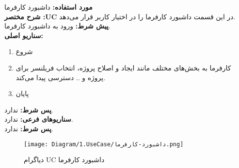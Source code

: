 \textbf{مورد استفاده:}
داشبورد کارفرما
\\
\textbf{شرح مختصر :UC}
در این قسمت داشبورد کارفرما را در اختیار کاربر قرار می‌دهد.
\\
\textbf{پيش شرط:}
ورود به داشبورد کارفرما.
\\
\textbf{سناريو اصلی:}
\begin{enumerate}
	\item
	شروع
	\item
	کارفرما به بخش‌های مختلف مانند ایجاد و اصلاح پروژه، انتخاب فریلنسر برای پروژه و .. دسترسی پیدا می‌کند.
	\item
	پایان
\end{enumerate}

\noindent
\textbf{پس شرط:}
ندارد.
\\
\textbf{سناريوهای فرعی:}
ندارد.
\\
\textbf{پس شرط:}
ندارد.


\begin{figure}[H]
	\centering
	\texttt{[image: Diagram/1.UseCase/داشبورد-کارفرما.png]}
	\caption{دیاگرام UC ‌داشبورد کارفرما}
	\label{fig:uc:داشبورد-کارفرما}
\end{figure}